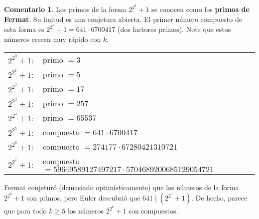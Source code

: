 \documentclass{article}
\theoremstyle{definition}
\newtheorem*{comentario}{Comentario}
\begin{document}
\begin{comentario}
  Los primos de la forma $2^{2^k} + 1$ se conocen como los
  \textbf{primos de Fermat}. Su finitud es una conjetura abierta.
  El primer número compuesto de esta forma es $2^{2^5}+1 = 641\cdot 6700417$
  (dos factores primos). Note que estos números crecen muy rápido con $k$.

    \begin{center}
      \begin{tabular}{ll}
        $2^{2^0} + 1\colon$ & primo $= 3$ \\
        $2^{2^1} + 1\colon$ & primo $= 5$ \\
        $2^{2^2} + 1\colon$ & primo $= 17$ \\
        $2^{2^3} + 1\colon$ & primo $= 257$ \\
        $2^{2^4} + 1\colon$ & primo $= 65537$ \\
        $2^{2^5} + 1\colon$ & compuesto $= 641\cdot 6700417$ \\
        $2^{2^6} + 1\colon$ & compuesto $= 274177\cdot 67280421310721$ \\
        $2^{2^7} + 1\colon$ & compuesto $= 59649589127497217\cdot 5704689200685129054721$
      \end{tabular}
    \end{center}

    Fermat conjeturó (demasiado optimísticamente) que los números de la forma
    $2^{2^k} + 1$ son primos, pero Euler descubrió que
    $641 \mid (2^{2^5} + 1)$. De hecho, parece que para todo $k \ge 5$ los
    números $2^{2^k} + 1$ son compuestos.
\end{comentario}

\ifdefined\solutions
\else
\pagebreak
\fi
\end{document}
